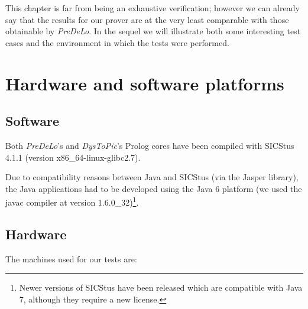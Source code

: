 \documentclass[a4paper, 11pt, oneside]{duthesis}
\begin{document}
This chapter is far from being an exhaustive verification; however we can already say that the results for our prover are at the very least comparable with those obtainable by \emph{PreDeLo}.
In the sequel we will illustrate both some interesting test cases and the environment in which the tests were performed.

\section{Hardware and software platforms}

\subsection{Software}

Both \emph{PreDeLo}'s and \emph{DysToPic}'s Prolog cores have been compiled with SICStus 4.1.1 (version x86\_64-linux-glibc2.7).

Due to compatibility reasons between Java and SICStus (via the Jasper library), the Java applications had to be developed using the Java 6 platform (we used the javac compiler at version 1.6.0\_32)\footnote{Newer versions of SICStus have been released which are compatible with Java 7, although they require a new license.}.



\newpage

\subsection{Hardware}\label{hardware}
The machines used for our tests are:
\end{document}
